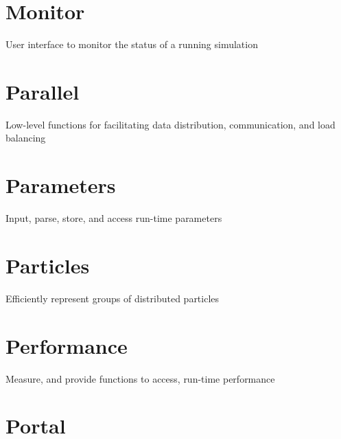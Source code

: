 \documentclass{book}
\begin{document}
\section{Monitor}

User interface to monitor the status of a running simulation

\section{Parallel}

Low-level functions for facilitating data distribution, communication,
and load balancing

\section{Parameters}

Input, parse, store, and access run-time parameters

\section{Particles}

Efficiently represent groups of distributed particles

\section{Performance}

Measure, and provide functions to access, run-time performance

\section{Portal}
\end{document}
